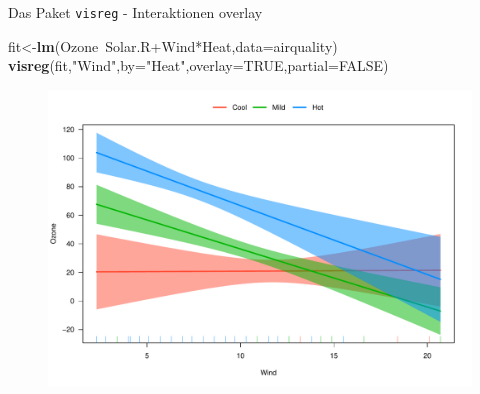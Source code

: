 \documentclass[ignorenonframetext,]{beamer}
\newenvironment{Shaded}{}{}
\newcommand{\KeywordTok}[1]{\textcolor[rgb]{0.00,0.44,0.13}{\textbf{{#1}}}}
\newcommand{\DataTypeTok}[1]{\textcolor[rgb]{0.56,0.13,0.00}{{#1}}}
\newcommand{\StringTok}[1]{\textcolor[rgb]{0.25,0.44,0.63}{{#1}}}
\newcommand{\OtherTok}[1]{\textcolor[rgb]{0.00,0.44,0.13}{{#1}}}
\newcommand{\NormalTok}[1]{{#1}}
\begin{document}
\begin{frame}[fragile]{Das Paket \texttt{visreg} - Interaktionen
overlay}

\begin{Shaded}
\begin{Highlighting}[]
\NormalTok{fit<-}\KeywordTok{lm}\NormalTok{(Ozone~Solar.R+Wind*Heat,}\DataTypeTok{data=}\NormalTok{airquality)}
\KeywordTok{visreg}\NormalTok{(fit,}\StringTok{"Wind"}\NormalTok{,}\DataTypeTok{by=}\StringTok{"Heat"}\NormalTok{,}\DataTypeTok{overlay=}\OtherTok{TRUE}\NormalTok{,}\DataTypeTok{partial=}\OtherTok{FALSE}\NormalTok{)}
\end{Highlighting}
\end{Shaded}

\begin{figure}[htbp]
\centering
\includegraphics{RSocialScience2_files/figure-beamer/unnamed-chunk-87-1.pdf}
\caption{}
\end{figure}

\end{frame}
\end{document}
